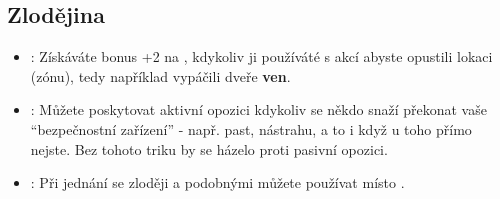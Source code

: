 \subsection{Zlodějina}
\label{sec:trik-zlodejina}

\begin{itemize}
\item{}:
  \label{sec:zlodejina-vratka}
  Získáváte bonus +2 na , kdykoliv ji používáté s akcí  abyste opustili lokaci (zónu), tedy například vypáčili dveře \textbf{ven}.

\item{}:
  \label{sec:zlodejina-odbornik}
  Můžete poskytovat aktivní opozici kdykoliv se někdo snaží překonat vaše ``bezpečnostní zařízení'' - např. past, nástrahu, a to i když u toho přímo nejste. Bez tohoto triku by se házelo proti pasivní opozici.

\item{}:
  \label{sec:zlodejina-septani}
  Při jednání se zloději a podobnými můžete používat  místo .
\end{itemize}
  



